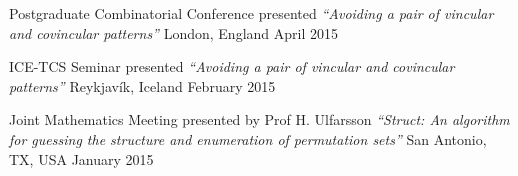 \begin{cvhonors}
\cvhonor
  {Postgraduate Combinatorial Conference} %
  {presented \textit{``Avoiding a pair of vincular and covincular patterns''}} %
  {London, England} %
  {April 2015} %


\cvhonor
  {ICE-TCS Seminar} %
  {presented \textit{``Avoiding a pair of vincular and covincular patterns''}} %
  {Reykjavík, Iceland} %
  {February 2015} %


\cvhonor
  {Joint Mathematics Meeting} %
  {presented by Prof H. Ulfarsson \textit{``Struct: An algorithm for guessing the structure and enumeration of permutation sets''}} %
  {San Antonio, TX, USA} %
  {January 2015} %

\end{cvhonors}
